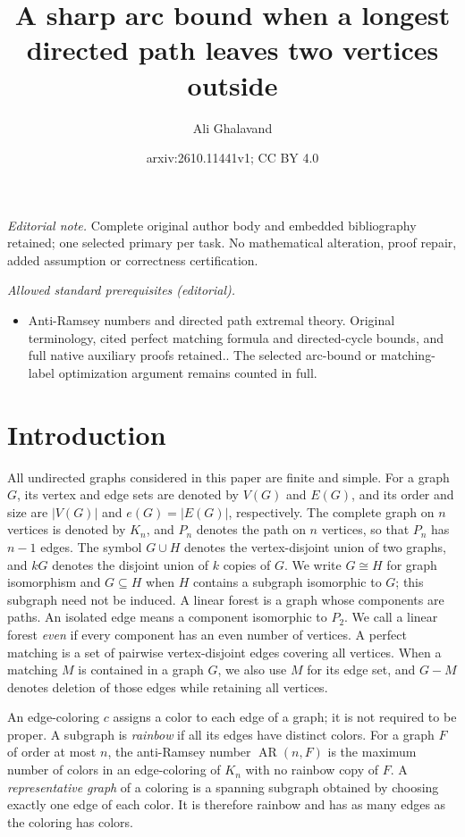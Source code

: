 \documentclass[10pt,a4paper]{article}
\title{A sharp arc bound when a longest directed path leaves two vertices outside}
\author{Ali Ghalavand}
\date{arxiv:2610.11441v1; CC BY 4.0}
\DeclareMathOperator{\AR}{AR}
\begin{document}
\maketitle
\noindent\textit{Editorial note.} Complete original author body and embedded bibliography retained; one selected primary per task. No mathematical alteration, proof repair, added assumption or correctness certification.\par\medskip
\noindent\textit{Allowed standard prerequisites (editorial).}\begin{itemize}
\item Anti-Ramsey numbers and directed path extremal theory. Original terminology, cited perfect matching formula and directed-cycle bounds, and full native auxiliary proofs retained.. The selected arc-bound or matching-label optimization argument remains counted in full.
\end{itemize}\medskip
\section{Introduction}

All undirected graphs considered in this paper are finite and simple.
For a graph $G$, its vertex and edge sets are denoted by $V(G)$ and $E(G)$,
and its order and size are $|V(G)|$ and $e(G)=|E(G)|$, respectively.
The complete graph on $n$ vertices is denoted by $K_n$, and $P_n$ denotes
the path on $n$ vertices, so that $P_n$ has $n-1$ edges.
The symbol $G\cup H$ denotes the vertex-disjoint union of two graphs,
and $kG$ denotes the disjoint union of $k$ copies of $G$.
We write $G\cong H$ for graph isomorphism and $G\subseteq H$ when $H$
contains a subgraph isomorphic to $G$; this subgraph need not be induced.
A linear forest is a graph whose components are paths. An isolated edge
means a component isomorphic to $P_2$. We call a linear forest \emph{even} if every
component has an even number of vertices. A perfect matching is a set of
pairwise vertex-disjoint edges covering all vertices. When a matching $M$ is contained in
a graph $G$, we also use $M$ for its edge set, and $G-M$ denotes deletion
of those edges while retaining all vertices.

An edge-coloring $c$ assigns a color to each edge of a graph; it is not
required to be proper. A subgraph is \emph{rainbow} if all its edges have
distinct colors. For a graph $F$ of order at most $n$, the anti-Ramsey number
$\AR(n,F)$ is the maximum number of colors in an edge-coloring of $K_n$
with no rainbow copy of $F$. A \emph{representative graph} of a coloring is a spanning subgraph obtained
by choosing exactly one edge of each color. It is therefore rainbow and
has as many edges as the coloring has colors.
\end{document}
